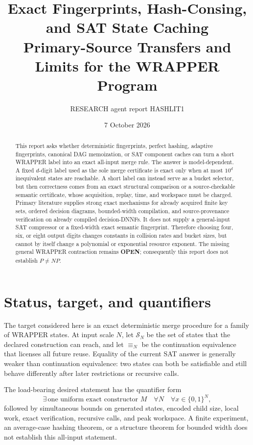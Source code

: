 \documentclass[11pt]{article}
\title{Exact Fingerprints, Hash-Consing, and SAT State Caching\\
Primary-Source Transfers and Limits for the WRAPPER Program}
\author{RESEARCH agent report HASHLIT1}
\date{7 October 2026}
\begin{document}
\maketitle

\begin{abstract}
This report asks whether deterministic fingerprints, perfect hashing,
adaptive fingerprints, canonical DAG memoization, or SAT component caches can
turn a short WRAPPER label into an exact all-input merge rule.  The answer is
model-dependent.  A fixed $d$-digit label used as the sole merge certificate
is exact only when at most $10^d$ inequivalent states are reachable.  A short
label can instead serve as a bucket selector, but then correctness comes from
an exact structural comparison or a source-checkable semantic certificate,
whose acquisition, replay, time, and workspace must be charged.  Primary
literature supplies strong exact mechanisms for already acquired finite key
sets, ordered decision diagrams, bounded-width compilation, and
source-provenance verification on already compiled decision-DNNFs.  It does
not supply a general-input SAT compressor or a fixed-width exact semantic
fingerprint.  Therefore choosing four, six, or eight output digits changes
constants in collision rates and bucket sizes, but cannot by itself change a
polynomial or exponential resource exponent.  The missing general WRAPPER
contraction remains \textbf{OPEN}; consequently this report does not establish
$P\ne NP$.
\end{abstract}

\section{Status, target, and quantifiers}

The target considered here is an exact deterministic merge procedure for a
family of WRAPPER states.  At input scale $N$, let $\mathcal S_N$ be the set
of states that the declared construction can reach, and let $\equiv_N$ be the
continuation equivalence that licenses all future reuse.  Equality of the
current SAT answer is generally weaker than continuation equivalence: two
states can both be satisfiable and still behave differently after later
restrictions or recursive calls.

The load-bearing desired statement has the quantifier form
\[
  \exists\,\text{one uniform exact constructor }M\quad
  \forall N\quad\forall x\in\{0,1\}^N,
\]
followed by simultaneous bounds on generated states, encoded child size,
local work, exact verification, recursive calls, and peak workspace.  A
finite experiment, an average-case hashing theorem, or a structure theorem
for bounded width does not establish this all-input statement.
\end{document}
